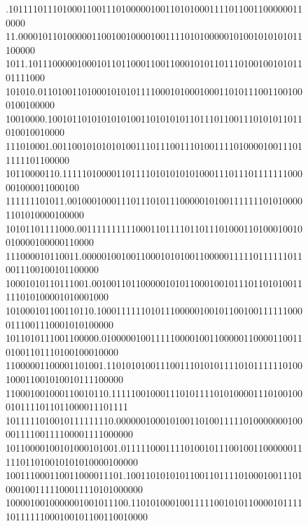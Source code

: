\documentclass[openany]{amsbook}
\numberwithin{equation}{chapter}
\numberwithin{figure}{chapter}
\numberwithin{table}{chapter}
\theoremstyle{definition}	理dfn:Definition~?s			理exa:Example~?s
\theoremstyle{remark}		理cla:Claim~?s				理rem:Remark~?s
\begin{document}
\begin{figure}
{{		                             .1011110111010001100111010000010011010100011110110011000000110000 \\
		                           11.0000101101000001100100100001001111010100000101001010101011100000 \\
		                         1011.1011100000100010110110001100110001010110111010010010101101111000 \\
		                       101010.0110100110100010101011110001010001000110101110011001000100100000 \\
		                     10010000.1001011010101010100110101010110111011001110101011011010010010000 \\
		                    111010001.0011001010101010011101110011101001111010000100111011111101100000 \\
		                  10110000110.1111101000011011110101010101000111011101111111000001000011000100 \\
		                 111111101011.0010001000111011101011100000101001111111010100001101010000100000 \\
		               10101101111000.0011111111110001101111011011101000110100010010010000100000110000 \\
		              111000010110011.0000010010011000101010011000001111101111110110011100100101100000 \\
		            10001010110111001.0010011011000001010110001001011101101010011111010100001010001000 \\
		           101000101100110110.1000111111010111000001001011001001111110000111001110001010100000 \\
		          1011010111001100000.0100000100111110000100110000011000011001101001101110100100010000 \\
		         11000001100001101001.1101010100111001110101011110101111110100100011001010010111100000 \\
		        110001001000110010110.1111100100011101011110101000011101001000101111011011000011101111 \\
		       1011111010010111111110.0000001000101001101001111101000000010000111100111100001111000000 \\
		      10110000100101000101001.0111110001111010010111001001100000011111011010010101010000100000 \\
		     100111000110011000011101.1001101010101100110111101000100111010001001111100011110101000000 \\
		    1000010010000001001011100.1101010001001111100101011000010111110111111000100101100110010000 \\
}}
\end{figure}
\end{document}
